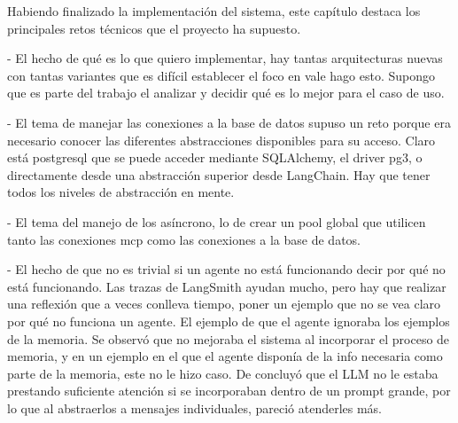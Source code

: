 Habiendo finalizado la implementación del sistema, este capítulo destaca los principales retos técnicos que el proyecto ha supuesto. 

- El hecho de qué es lo que quiero implementar, hay tantas arquitecturas nuevas con tantas variantes que es difícil establecer el foco en vale hago esto. Supongo que es parte del trabajo el analizar y decidir qué es lo mejor para el caso de uso.

- El tema de manejar las conexiones a la base de datos supuso un reto porque era necesario conocer las diferentes abstracciones disponibles para su acceso. Claro está postgresql que se puede acceder mediante SQLAlchemy, el driver pg3, o directamente desde una abstracción superior desde LangChain. Hay que tener todos los niveles de abstracción en mente. 

- El tema del manejo de los asíncrono, lo de crear un pool global que utilicen tanto las conexiones mcp como las conexiones a la base de datos.

- El hecho de que no es trivial si un agente no está funcionando decir por qué no está funcionando. Las trazas de LangSmith ayudan mucho, pero hay que realizar una reflexión que a veces conlleva tiempo, poner un ejemplo que no se vea claro por qué no funciona un agente. El ejemplo de que el agente ignoraba los ejemplos de la memoria. Se observó que no mejoraba el sistema al incorporar el proceso de memoria, y en un ejemplo en el que el agente disponía de la info necesaria como parte de la memoria, este no le hizo caso. De concluyó que el LLM no le estaba prestando suficiente atención si se incorporaban dentro de un prompt grande, por lo que al abstraerlos a mensajes individuales, pareció atenderles más. 
